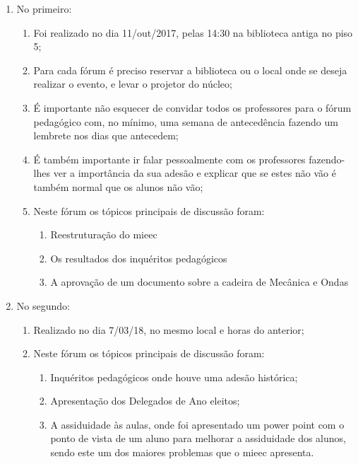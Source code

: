 \begin{enumerate}
\item No primeiro:
	\begin{enumerate}
	\item Foi realizado no dia 11/out/2017, pelas 14:30 na biblioteca antiga no piso 5;
	\item Para cada fórum é preciso reservar a biblioteca ou o local onde se deseja realizar o evento, e levar o projetor do núcleo;
	\item É importante não esquecer de convidar todos os professores para o fórum pedagógico com, no mínimo, uma semana de antecedência fazendo um lembrete nos dias que antecedem;
    \item É também importante ir falar pessoalmente com os professores fazendo-lhes ver a importância da sua adesão e explicar que se estes não vão é também normal que os alunos não vão;
	\item Neste fórum os tópicos principais de discussão foram:
    	\begin{enumerate}
    	\item Reestruturação do \acrshort{mieec} 
		\item Os resultados dos inquéritos pedagógicos 
		\item A aprovação de um documento sobre a cadeira de Mecânica e Ondas
    	\end{enumerate}
	\end{enumerate}
\item No segundo:
	\begin{enumerate}
	\item Realizado no dia 7/03/18, no mesmo local e horas do anterior;
	\item Neste fórum os tópicos principais de discussão foram:
		\begin{enumerate}
		\item Inquéritos pedagógicos onde houve uma adesão histórica;
        \item Apresentação dos Delegados de Ano eleitos;
        \item A assiduidade às aulas, onde foi apresentado um power point com o ponto de vista de um aluno para melhorar a assiduidade dos alunos, sendo este um dos maiores problemas que o \acrshort{mieec} apresenta.
		\end{enumerate}
	\end{enumerate}
\end{enumerate}






